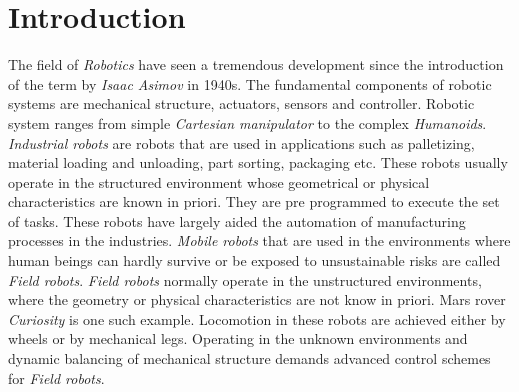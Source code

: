 \chapter{Introduction}
\label{sec:einleitung}
The field of \emph{Robotics} have seen a tremendous development since the introduction of the term by \emph{Isaac Asimov} in 1940s. The fundamental components of robotic systems are mechanical structure, actuators, sensors and controller. Robotic system ranges from simple \emph{Cartesian manipulator} to the complex \emph{Humanoids}. \emph{Industrial robots} are robots that are used in applications such as palletizing, material loading and unloading, part sorting, packaging etc. These robots usually operate in the structured environment whose geometrical or physical characteristics are known in priori. They are pre programmed to execute the set of tasks. These robots have largely aided the automation of manufacturing processes in the industries. \emph{Mobile robots} that are used in the environments where human beings can hardly survive or be exposed to unsustainable risks are called \emph{Field robots}. \emph{Field robots} normally operate in the unstructured environments, where the geometry or physical characteristics are not know in priori. Mars rover \emph{Curiosity} is one such example. Locomotion in these robots are achieved either by wheels or by mechanical legs. Operating in the unknown environments and dynamic balancing of mechanical structure demands advanced control schemes for \emph{Field robots}.
